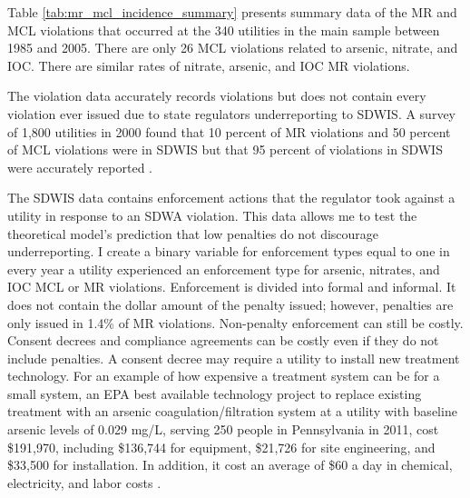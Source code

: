 \documentclass[12pt]{article}
\begin{document}

Table \ref{tab:mr_mcl_incidence_summary} presents summary data of the MR and MCL violations that occurred at the 340 utilities in the main sample between 1985 and 2005. There are only 26 MCL violations related to arsenic, nitrate, and IOC. There are similar rates of nitrate, arsenic, and IOC MR violations.

The violation data accurately records violations but does not contain every violation ever issued due to state regulators underreporting to SDWIS. A survey of 1,800 utilities in 2000 found that 10 percent of MR violations and 50 percent of MCL violations were in SDWIS but that 95 percent of violations in SDWIS were accurately reported \parencite{epaviolationreliability}.

The SDWIS data contains enforcement actions that the regulator took against a utility in response to an SDWA violation. This data allows me to test the theoretical model's prediction that low penalties do not discourage underreporting. I create a binary variable for enforcement types equal to one in every year a utility experienced an enforcement type for arsenic, nitrates, and IOC MCL or MR violations. Enforcement is divided into formal and informal. It does not contain the dollar amount of the penalty issued; however, penalties are only issued in 1.4\% of MR violations. Non-penalty enforcement can still be costly. Consent decrees and compliance agreements can be costly even if they do not include penalties. A consent decree may require a utility to install new treatment technology. For an example of how expensive a treatment system can be for a small system, an EPA best available technology project to replace existing treatment with an arsenic coagulation/filtration system at a utility with baseline arsenic levels of 0.029 mg/L, serving 250 people in Pennsylvania in 2011, cost \$191,970, including \$136,744 for equipment, \$21,726 for site engineering, and \$33,500 for installation. In addition, it cost an average of \$60 a day in chemical, electricity, and labor costs \parencite{epaarsenicbat}.
\end{document}
